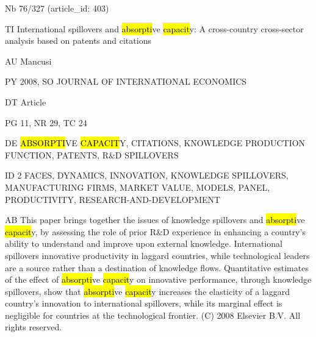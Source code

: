 \documentclass[a4paper]{article}
\begin{document}
\vspace*{-2cm}
Nb \tabto{0cm}76/327 (article\_id: 403)\par
TI \tabto{0cm}International spillovers and \hl{absorpti}ve \hl{capacit}y: A cross-country cross-sector analysis based on patents and citations\par
AU \tabto{0cm}Mancusi\par
PY \tabto{0cm}2008, SO JOURNAL OF INTERNATIONAL ECONOMICS\par
DT \tabto{0cm}Article\par
PG \tabto{0cm}11, NR 29, TC 24\par
DE \tabto{0cm}\hl{ABSORPTI}VE \hl{CAPACIT}Y, CITATIONS, KNOWLEDGE PRODUCTION FUNCTION, PATENTS, R\&D SPILLOVERS\par
ID \tabto{0cm}2 FACES, DYNAMICS, INNOVATION, KNOWLEDGE SPILLOVERS, MANUFACTURING FIRMS, MARKET VALUE, MODELS, PANEL, PRODUCTIVITY, RESEARCH-AND-DEVELOPMENT\par
AB \tabto{0cm}This paper brings together the issues of knowledge spillovers and \hl{absorpti}ve \hl{capacit}y, by assessing the role of prior R\&D experience in enhancing a country's ability to understand and improve upon external knowledge. International spillovers innovative productivity in laggard countries, while technological leaders are a source rather than a destination of knowledge flows. Quantitative estimates of the effect of \hl{absorpti}ve \hl{capacit}y on innovative performance, through knowledge spillovers, show that \hl{absorpti}ve \hl{capacit}y increases the elasticity of a laggard country's innovation to international spillovers, while its marginal effect is negligible for countries at the technological frontier. (C) 2008 Elsevier B.V. All rights reserved.\par
\clearpage
\end{document}
